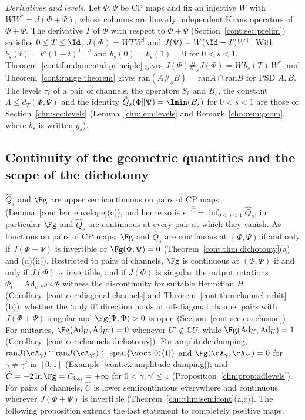 \emph{Derivatives and levels.}
Let $\Phi,\Psi$ be CP maps and fix an injective $W$ with $WW^\dagger=J(\Phi+\Psi)$, whose columns are linearly independent Kraus operators of $\Phi+\Psi$. The derivative $T$ of $\Phi$ with respect to $\Phi+\Psi$ (Section~\ref{cont:sec:prelim}) satisfies $0\le T\le\Id$, $J(\Phi)=WTW^\dagger$ and $J(\Psi)=W(\Id-T)W^\dagger$. With $b_s(t)=t^s(1-t)^{1-s}$ and $b_s(0)=b_s(1)=0$ for $0<s<1$, Theorem~\ref{cont:fundamental principle} gives $J(\Psi)\#_sJ(\Phi)=W\,b_s(T)\,W^\dagger$, and Theorem~\ref{cont:range theorem} gives $\mathrm{ran}(A\#_sB)=\mathrm{ran}A\cap\mathrm{ran}B$ for PSD $A,B$. The levels $\tau_\ell$ of a pair of channels, the operators $S_\ell$ and $B_s$, the constant $\Lambda\le d_T(\Phi,\Psi)$ and the identity $\hat Q_s(\Phi\|\Psi)=\lmin(B_s)$ for $0<s<1$ are those of Section~\ref{chn:sec:levels} (Lemma~\ref{chn:lem:levels} and Remark~\ref{chn:rem:geom}, where $b_s$ is written $g_s$).

\subsection*{Continuity of the geometric quantities and the scope of the dichotomy}
$\hat Q_s$ and $\Fg$ are upper semicontinuous on pairs of CP maps (Lemma~\ref{cont:lem:envelope}(c)), and hence so is $e^{-\hat C}=\inf_{0<s<1}\hat Q_s$; in particular $\Fg$ and $\hat Q_s$ are continuous at every pair at which they vanish. As functions on pairs of CP maps, $\Fg$ and $\hat Q_s$ are continuous at $(\Phi,\Psi)$ if and only if $J(\Phi+\Psi)$ is invertible or $\Fg(\Phi,\Psi)=0$ (Theorem~\ref{cont:thm:dichotomy}(a) and (d)(ii)). Restricted to pairs of channels, $\Fg$ is continuous at $(\Phi,\Phi)$ if and only if $J(\Phi)$ is invertible, and if $J(\Phi)$ is singular the output rotations $\Phi_t=\mathrm{Ad}_{e^{-itH}}\circ\Phi$ witness the discontinuity for suitable Hermitian $H$ (Corollary~\ref{cont:cor:diagonal channels} and Theorem~\ref{cont:thm:channel orbit}(b)); whether the `only if' direction holds at off-diagonal channel pairs with $J(\Phi+\Psi)$ singular and $\Fg(\Phi,\Psi)>0$ is open (Section~\ref{cont:sec:conclusion}). For unitaries, $\Fg(\mathrm{Ad}_U,\mathrm{Ad}_{U'})=0$ whenever $U'\notin\mathbb CU$, while $\Fg(\mathrm{Ad}_U,\mathrm{Ad}_U)=1$ (Corollary~\ref{cont:cor:channels dichotomy}). For amplitude damping, $\mathrm{ran}J(\cA_\gamma)\cap\mathrm{ran}J(\cA_{\gamma'})\subseteq\mathrm{span}\{\vect|0\rangle\langle1|\}$ and $\Fg(\cA_\gamma,\cA_{\gamma'})=0$ for $\gamma\ne\gamma'$ in $[0,1]$ (Example~\ref{cont:ex:amplitude damping}), and $\hat C=-2\ln\Fg=C_{\rm bar}=+\infty$ for $0<\gamma,\gamma'\le1$ (Proposition~\ref{chn:prop:adlevels}). For pairs of channels, $\hat C$ is lower semicontinuous everywhere and continuous wherever $J(\Phi+\Psi)$ is invertible (Theorem~\ref{chn:thm:semicont}(a,c)). The following proposition extends the last statement to completely positive maps.

